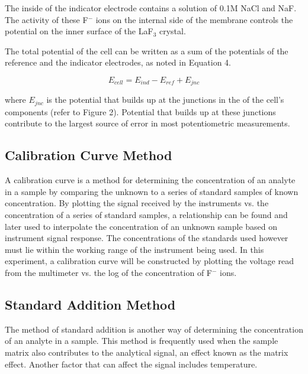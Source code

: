 \documentclass{article}
\begin{document}
The inside of the indicator electrode contains a solution of 0.1M NaCl and NaF.
The activity of these F$^-$ ions on the internal side of the membrane controls
the potential on the inner surface of the LaF$_3$ crystal.

The total potential of the cell can be written as a sum of the potentials of the
reference and the indicator electrodes, as noted in Equation 4.
\begin{center}
    \begin{equation}
        E_{cell} = E_{ind} - E_{ref} + E_{jnc}
    \end{equation}
\end{center}
where $E_{jnc}$ is the potential that builds up at the junctions in the
of the cell's components (refer to Figure 2). Potential that builds up at these
junctions contribute to the largest source of error in most potentiometric
measurements. \cite{nmt}

\subsection {Calibration Curve Method}
A calibration curve is a method for determining the concentration of an analyte
in a sample by comparing the unknown to a series of standard samples of known
concentration. By plotting the signal received by the instruments vs. the concentration of a series of standard samples, a relationship can be found and
later used to interpolate the concentration of an unknown sample based on
instrument signal response. The concentrations of the standards used however
must lie within the working range of the instrument being used. In this
experiment, a calibration curve will be constructed by plotting the voltage read
from the multimeter vs. the log of the concentration of F$^-$ ions.

\subsection {Standard Addition Method}
The method of standard addition is another way of determining the concentration
of an analyte in a sample. This method is frequently used when the sample matrix
also contributes to the analytical signal, an effect known as the matrix effect.
\cite{Harris} Another factor that can affect the signal includes temperature.
\end{document}
